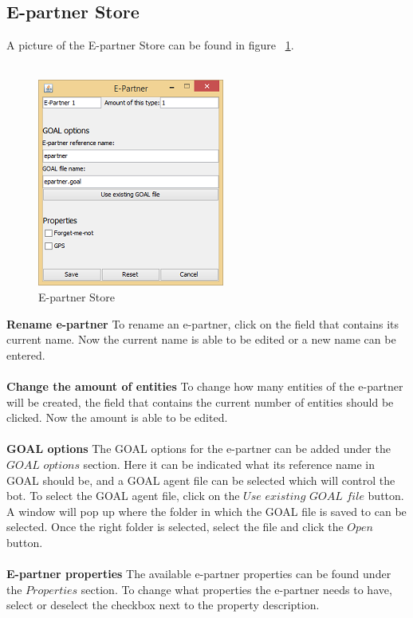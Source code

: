 \subsection{E-partner Store}
A picture of the E-partner Store can be found in figure ~\ref{fig:es}.\\\\
\begin{figure}[h]
\begin{center}
\includegraphics{NewFeatures/es.png}
\end{center}
\caption{E-partner Store}
\label{fig:es}
\end{figure}
\textbf{Rename e-partner}
To rename an e-partner, click on the field that contains its current name. Now the current name is able to be edited or a new name can be entered.
\\\\
\textbf{Change the amount of entities}
To change how many entities of the e-partner will be created, the field that contains the current number of entities should be clicked. Now the amount is able to be edited.
\\\\
\textbf{GOAL options}
The GOAL options for the e-partner can be added under the $GOAL$ $options$ section. Here it can be indicated what its reference name in GOAL should be, and a GOAL agent file can be selected which will control the bot. To select the GOAL agent file, click on the $Use$ $existing$ $GOAL$ $file$ button. A window will pop up where the folder in which the GOAL file is saved to can be selected. Once the right folder is selected, select the file and click the $Open$ button.
\\\\
\textbf{E-partner properties}
The available e-partner properties can be found under the $Properties$ section. To change what properties the e-partner needs to have, select or deselect the checkbox next to the property description.
